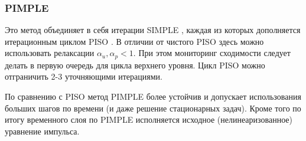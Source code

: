\subsubsection{PIMPLE}
\label{sec:fvm_pimple_steps}
Это метод объединяет в себя итерации SIMPLE ,
каждая из которых дополняется итерационным циклом PISO .
В отличии от чистого PISO
здесь можно использовать релаксации $\alpha_u, \alpha_p < 1$.
При этом мониторинг сходимости следует делать в первую очередь
для цикла верхнего уровня. Цикл PISO можно отграничить 2-3 уточняющими итерациями.

По сравнению с PISO метод PIMPLE более устойчив и допускает использования больших шагов по времени (и даже решение стационарных задач).
Кроме того по итогу временного слоя по PIMPLE исполняется исходное (нелинеаризованное) уравнение импульса.

